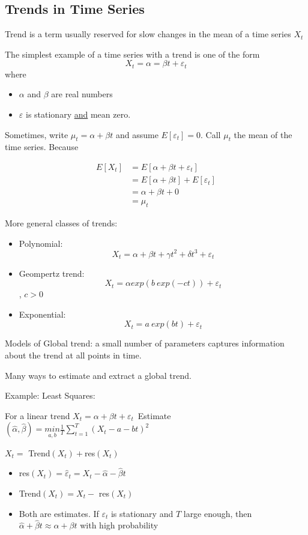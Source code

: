 \subsection{Trends in Time Series}


Trend is a term usually reserved for slow changes in the mean of a time series $X_t$

The simplest example of a time series with a trend is one of the form 
$$X_t = \alpha = \beta t + \varepsilon_t$$
where \begin{itemize}
    \item $\alpha$ and $\beta$ are real numbers
    \item $\varepsilon$ is stationary \underline{and} mean zero.
\end{itemize}
Sometimes, write $\mu_t = \alpha + \beta t$ and assume $E[\varepsilon_t]=0$. Call $\mu_t$ the mean of the time series. Because

\begin{align*}
    E[X_t] &= E[\alpha + \beta t + \varepsilon_t] \\
    &= E[\alpha + \beta t] + E[\varepsilon_t] \\
    &= \alpha + \beta t + 0\\
    &= \mu_t
\end{align*}

More general classes of trends:
\begin{itemize}
    \item Polynomial: 
    $$X_t=\alpha+\beta t +\gamma t^2 + \delta t^3 + \varepsilon_t$$
    \item Geompertz trend:
    $$ X_t = \alpha exp(b\ exp(-ct)) + \varepsilon_t$$, $c>0$
    \item Exponential:
    $$X_t =a\ exp(bt) + \varepsilon_t$$
\end{itemize}
Models of Global trend: a small number of parameters captures information about the trend at all points in time.

Many ways to estimate and extract a global trend.

Example: \quad Least Squares:
\begin{adjustwidth}{2em}{0pt}
For a linear trend $X_t=\alpha + \beta t + \varepsilon_t$\
Estimate $(\hat{\alpha}, \hat{\beta})=\underset{a,b}{min} \frac{1}{T} \sum_{t=1}^T (X_t-a-bt)^2$
\end{adjustwidth}

$X_t =$ Trend$(X_t) + $res$(X_t)$
\begin{itemize}
    \item res$(X_t)=\hat{\varepsilon}_t=X_t-\hat{\alpha} -\hat{\beta}t $
    \item Trend$(X_t)=X_t-$ res$(X_t)$
    \item Both are estimates. If $\varepsilon_t$ is stationary and $T$ large enough, then $\hat{\alpha}+\hat{\beta}t \approx \alpha+\beta t$ with high probability
\end{itemize}

